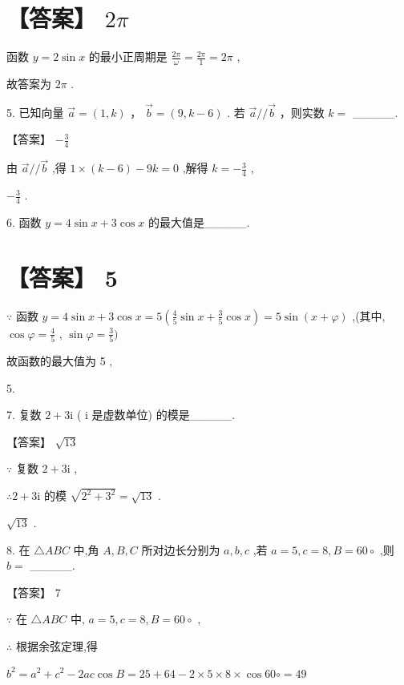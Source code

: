 \documentclass[10pt]{article}
\begin{document}
\section*{【答案】 \({2\pi }\)}

函数 \(y = 2\sin x\) 的最小正周期是 \(\frac{2\pi }{\omega } = \frac{2\pi }{1} = {2\pi }\) ,

故答案为 \({2\pi }\) .

5. 已知向量 \(\overrightarrow{a} = \left( {1,k}\right)\) ， \(\overrightarrow{b} = \left( {9,k - 6}\right)\) . 若 \(\overrightarrow{a}//\overrightarrow{b}\) ，则实数 \(k =\) \_\_\_\_\_.

【答案】 \(- \frac{3}{4}\)

由 \(\overrightarrow{a}//\overrightarrow{b}\) ,得 \(1 \times  \left( {k - 6}\right)  - {9k} = 0\) ,解得 \(k =  - \frac{3}{4}\) ,

\(- \frac{3}{4}\) .

6. 函数 \(y = 4\sin x + 3\cos x\) 的最大值是\_\_\_\_\_.

\section*{【答案】 5}

\(\because\) 函数 \(y = 4\sin x + 3\cos x = 5\left( {\frac{4}{5}\sin x + \frac{3}{5}\cos x}\right)  = 5\sin \left( {x + \varphi }\right)\) ,(其中, \(\cos \varphi  = \frac{4}{5}\) , \(\sin \varphi  = \frac{3}{5})\)

故函数的最大值为 5 ,

5.

7. 复数 \(2 + 3\mathrm{i}\) ( \(\mathrm{i}\) 是虚数单位) 的模是\_\_\_\_\_.

【答案】 \(\sqrt{13}\)

\(\because\) 复数 \(2 + 3\mathrm{i}\) ,

\(\therefore 2 + 3\mathrm{i}\) 的模 \(\sqrt{{2}^{2} + {3}^{2}} = \sqrt{13}\) .

\(\sqrt{13}\) .

8. 在 \(\bigtriangleup {ABC}\) 中,角 \(A,B,C\) 所对边长分别为 \(a,b,c\) ,若 \(a = 5,c = 8,B = {60} \circ\) ,则 \(b =\) \_\_\_\_\_.

【答案】 7

\(\because\) 在 \(\bigtriangleup {ABC}\) 中, \(a = 5,c = 8,B = {60} \circ\) ,

\(\therefore\) 根据余弦定理,得

\({b}^{2} = {a}^{2} + {c}^{2} - {2ac}\cos B = {25} + {64} - 2 \times  5 \times  8 \times  \cos {60} \circ   = {49}\)
\end{document}
